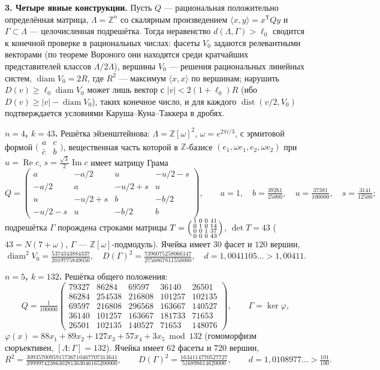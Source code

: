 \documentclass{article}
\newcommand{\Z}{\mathbb{Z}}
\newcommand{\diam}{\operatorname{diam}}
\newcommand{\dist}{\operatorname{dist}}
\begin{document}
\textbf{3. Четыре явные конструкции.}
Пусть $Q$ --- рациональная положительно определённая матрица, $\Lambda=\Z^n$
со скалярным произведением $\langle x,y\rangle=x^{\mathsf T}Qy$ и
$\Gamma\subset\Lambda$ --- целочисленная подрешётка. Тогда неравенство
$d(\Lambda,\Gamma)>\ell_0$ сводится к конечной проверке в рациональных числах:
фасеты $V_0$ задаются релевантными векторами (по теореме Вороного они
находятся среди кратчайших представителей классов $\Lambda/2\Lambda$),
вершины $V_0$ --- решения рациональных линейных систем,
$\diam V_0=2R$, где $R^2$ --- максимум $\langle x,x\rangle$ по вершинам;
нарушить $D(v)\ge\ell_0\diam V_0$ может лишь вектор с $|v|<2(1+\ell_0)R$
(ибо $D(v)\ge|v|-\diam V_0$), таких конечное число, и для каждого
$\dist(v/2,V_0)$ подтверждается условиями Каруша--Куна--Таккера в дробях.

{\bfseries\boldmath $n=4$, $k=43$.} Решётка эйзенштейнова: $\Lambda=\Z[\omega]^2$,
$\omega=e^{2\pi i/3}$, с эрмитовой формой
$\bigl(\begin{smallmatrix}a&c\\\bar c&b\end{smallmatrix}\bigr)$, вещественная
часть которой в $\Z$-базисе $(e_1,\omega e_1,e_2,\omega e_2)$ при
$u=\operatorname{Re}c$, $s=\tfrac{\sqrt3}2\operatorname{Im}c$ имеет матрицу
Грама
\[
Q=\left(\begin{smallmatrix}
a & -a/2 & u & -u/2-s\\
-a/2 & a & -u/2+s & u\\
u & -u/2+s & b & -b/2\\
-u/2-s & u & -b/2 & b
\end{smallmatrix}\right),\qquad
a=1,\quad b=\tfrac{39261}{25000},\quad u=\tfrac{37381}{100000},\quad s=\tfrac{3141}{12500};
\]
подрешётка $\Gamma$ порождена строками матрицы
$T=\Bigl(\begin{smallmatrix}1&0&0&41\\0&1&0&14\\0&0&1&37\\0&0&0&43\end{smallmatrix}\Bigr)$,
$\det T=43$ ($43=N(7+\omega)$, $\Gamma$ --- $\Z[\omega]$-подмодуль). Ячейка
имеет $30$ фасет и $120$ вершин,
\[
\diam^2V_0=\tfrac{5374343884337}{2019775849050},\quad
D(\Gamma)^2=\tfrac{7396075258066147}{2756867811550000},\quad
d=1{,}0041105\ldots>1{,}00411 .
\]

{\bfseries\boldmath $n=5$, $k=132$.} Решётка общего положения:
\[
Q=\tfrac1{100000}\left(\begin{smallmatrix}
79327&86284&69597&36140&26501\\
86284&254538&216808&101257&102135\\
69597&216808&296568&163667&140527\\
36140&101257&163667&181733&71653\\
26501&102135&140527&71653&148076
\end{smallmatrix}\right),
\qquad
\Gamma=\ker\varphi,
\]
$\varphi(x)=88x_1+89x_2+127x_3+57x_4+3x_5 \bmod 132$ (гомоморфизм сюръективен,
$[\Lambda:\Gamma]=132$). Ячейка имеет $62$ фасеты и $720$ вершин,
{\small
\[
R^2=\tfrac{3093570095915736710467707313641}{3999974238630281363046165200000},\qquad
D(\Gamma)^2=\tfrac{1634114770527727}{516898614620000},\qquad
d=1{,}0108977\ldots>\tfrac{101}{100}.
\]}
\end{document}

